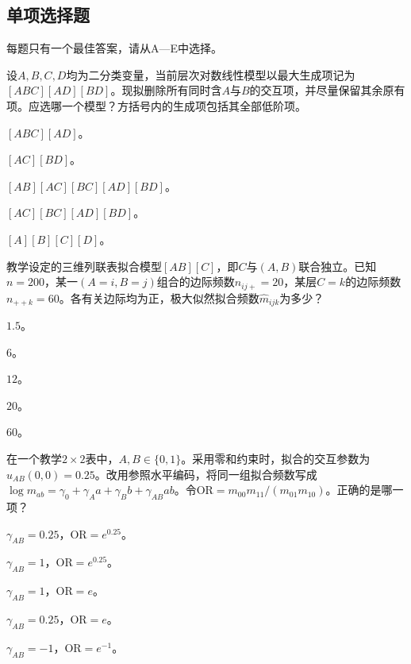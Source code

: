 \subsection{单项选择题}
每题只有一个最佳答案，请从A—E中选择。

\par\noindent\begin{minipage}{\linewidth}
设$A,B,C,D$均为二分类变量，当前层次对数线性模型以最大生成项记为$[ABC][AD][BD]$。现拟删除所有同时含$A$与$B$的交互项，并尽量保留其余原有项。应选哪一个模型？方括号内的生成项包括其全部低阶项。
\begin{choices}
\item $[ABC][AD]$。
\item $[AC][BD]$。
\item $[AB][AC][BC][AD][BD]$。
\item $[AC][BC][AD][BD]$。
\item $[A][B][C][D]$。
\end{choices}
\end{minipage}\par\medskip

\par\noindent\begin{minipage}{\linewidth}
教学设定的三维列联表拟合模型$[AB][C]$，即$C$与$(A,B)$联合独立。已知$n=200$，某一$(A=i,B=j)$组合的边际频数$n_{ij+}=20$，某层$C=k$的边际频数$n_{++k}=60$。各有关边际均为正，极大似然拟合频数$\widehat m_{ijk}$为多少？
\begin{choices}
\item $1.5$。
\item $6$。
\item $12$。
\item $20$。
\item $60$。
\end{choices}
\end{minipage}\par\medskip

\par\noindent\begin{minipage}{\linewidth}
在一个教学$2\times2$表中，$A,B\in\{0,1\}$。采用零和约束时，拟合的交互参数为$u_{AB}(0,0)=0.25$。改用参照水平编码，将同一组拟合频数写成$\log m_{ab}=\gamma_0+\gamma_Aa+\gamma_Bb+\gamma_{AB}ab$。令$\mathrm{OR}=m_{00}m_{11}/(m_{01}m_{10})$。正确的是哪一项？
\begin{choices}
\item $\gamma_{AB}=0.25$，$\mathrm{OR}=e^{0.25}$。
\item $\gamma_{AB}=1$，$\mathrm{OR}=e^{0.25}$。
\item $\gamma_{AB}=1$，$\mathrm{OR}=e$。
\item $\gamma_{AB}=0.25$，$\mathrm{OR}=e$。
\item $\gamma_{AB}=-1$，$\mathrm{OR}=e^{-1}$。
\end{choices}
\end{minipage}\par\medskip

